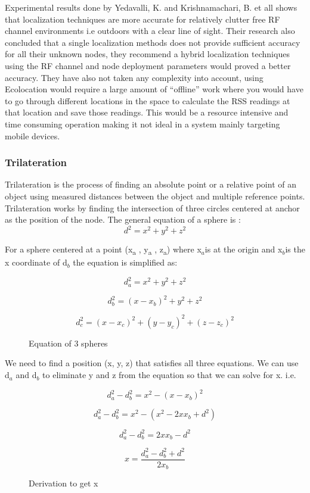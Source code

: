 Experimental results done by Yedavalli, K. and Krishnamachari, B.
et all shows that localization techniques are more accurate for relatively
clutter free RF channel environments i.e outdoors with a clear line
of sight. Their research also concluded that a single localization
methods does not provide sufficient accuracy for all their unknown
nodes, they recommend a hybrid localization techniques using the
RF channel and node deployment parameters would proved a better accuracy.
They have also not taken any complexity into account, using Ecolocation
would require a large amount of ``offline'' work where you would
have to go through different locations in the space to calculate the
RSS readings at that location and save those readings. This would
be a resource intensive and time consuming operation making it not
ideal in a system mainly targeting mobile devices.


\subsubsection{Trilateration} \label{trilateration_section}

Trilateration is the process of finding an absolute point or a relative
point of an object using measured distances between the object and
multiple reference points. Trilateration works by finding the intersection
of three circles centered at anchor as the position of the node. The
general equation of a sphere is :
\[
d^{2}=x^{2}+y^{2}+z^{2}
\]


For a sphere centered at a point (x\textsubscript{a} , y\textsubscript{a}
, z\textsubscript{a}) where x$_{a}$is at the origin and x$_{b}$is
the x coordinate of d$_{b}$ the equation is simplified as:

\begin{figure}[H]
\[
d_{a}^{2}=x^{2}+y^{2}+z^{2}
\]


\[
d_{b}^{2}=\left(x-x_{b}\right)^{2}+y^{2}+z^{2}
\]


\[
d_{c}^{2}=\left(x-x_{c}\right)^{2}+\left(y-y_{c}\right)^{2}+\left(z-z_{c}\right)^{2}
\]


\protect\caption{Equation of 3 spheres}


\end{figure}


We need to find a position (x, y, z) that satisfies all three equations.
We can use d$_{a}$ and d$_{b}$ to eliminate y and z from the equation
so that we can solve for x. i.e.

\begin{figure}[H]
\[
d_{a}^{2}-d_{b}^{2}=x^{2}-\left(x-x_{b}\right)^{2}
\]


\[
d_{a}^{2}-d_{b}^{2}=x^{2}-\left(x^{2}-2xx_{b}+d^{2}\right)
\]


\[
d_{a}^{2}-d_{b}^{2}=2xx_{b}-d^{2}
\]


\[
x=\frac{d_{a}^{2}-d_{b}^{2}+d^{2}}{2x_{b}}
\]


\protect\caption{Derivation to get x}
\end{figure}


